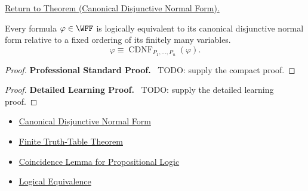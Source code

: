 \newpage
{}
\label{prf:canonical-disjunctive-normal-form-propositional-logic}

\begin{remark*}[Return]
\hyperref[thm:canonical-disjunctive-normal-form-propositional-logic]{Return to Theorem (Canonical Disjunctive Normal Form).}
\end{remark*}

\begin{theorem*}
Every formula \(\varphi\in\WFF\) is logically equivalent to its canonical
disjunctive normal form relative to a fixed ordering of its finitely many
variables.
\[
\varphi\equiv \operatorname{CDNF}_{P_1,\ldots,P_n}(\varphi).
\]
\end{theorem*}

\begin{proof}
\textbf{Professional Standard Proof.}~
TODO: supply the compact proof.
\end{proof}

\begin{proof}
\textbf{Detailed Learning Proof.}~
TODO: supply the detailed learning proof.
\end{proof}

\begin{remark*}
\end{remark*}

\begin{dependencies}
\begin{itemize}
  \item \hyperref[def:canonical-disjunctive-normal-form-propositional-logic]{Canonical Disjunctive Normal Form}
  \item \hyperref[thm:finite-truth-table-propositional-logic]{Finite Truth-Table Theorem}
  \item \hyperref[lem:coincidence-lemma-propositional-logic]{Coincidence Lemma for Propositional Logic}
  \item \hyperref[def:logical-equivalence-propositional-logic]{Logical Equivalence}
\end{itemize}
\end{dependencies}

\clearpage
